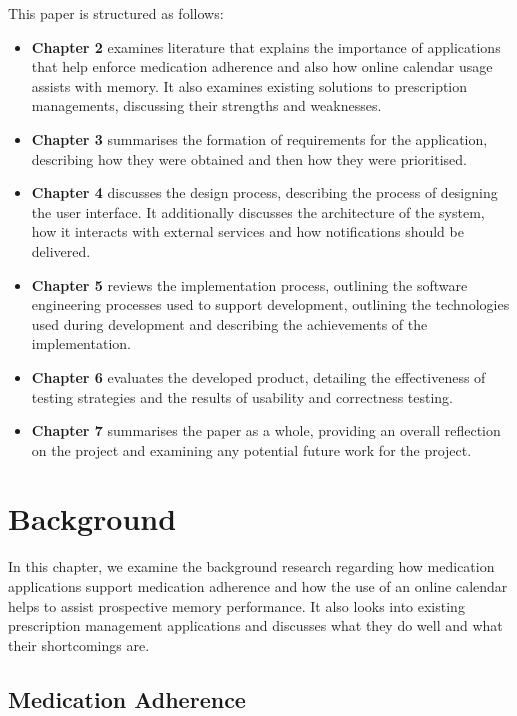 \documentclass{l4proj}
\begin{document}
This paper is structured as follows:
\begin{itemize}
    \item \textbf{Chapter 2} examines literature that explains the importance of applications that help enforce medication adherence and also how online calendar usage assists with memory. It also examines existing solutions to prescription managements, discussing their strengths and weaknesses.
    \item \textbf{Chapter 3} summarises the formation of requirements for the application, describing how they were obtained and then how they were prioritised.
    \item \textbf{Chapter 4} discusses the design process, describing the process of designing the user interface. It additionally discusses the architecture of the system, how it interacts with external services and how notifications should be delivered. 
    \item \textbf{Chapter 5} reviews the implementation process, outlining the software engineering processes used to support development, outlining the technologies used during development and describing the achievements of the implementation.
    \item \textbf{Chapter 6} evaluates the developed product, detailing the effectiveness of testing strategies and the results of usability and correctness testing.
    \item \textbf{Chapter 7} summarises the paper as a whole, providing an overall reflection on the project and examining any potential future work for the project.
\end{itemize}

\chapter{Background}

In this chapter, we examine the background research regarding how medication applications support medication adherence and how the use of an online calendar helps to assist prospective memory performance. It also looks into existing prescription management applications and discusses what they do well and what their shortcomings are.

\section{Medication Adherence}
\end{document}
